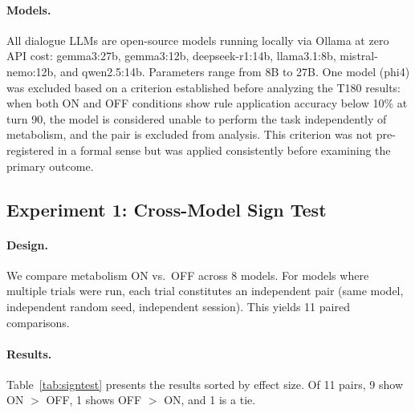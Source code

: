 \documentclass[11pt,a4paper]{article}
\begin{document}
\paragraph{Models.}
All dialogue LLMs are open-source models running locally via Ollama at zero API cost: gemma3:27b, gemma3:12b, deepseek-r1:14b, llama3.1:8b, mistral-nemo:12b, and qwen2.5:14b.
Parameters range from 8B to 27B.
One model (phi4) was excluded based on a criterion established before analyzing the T180 results: when both ON and OFF conditions show rule application accuracy below 10\% at turn 90, the model is considered unable to perform the task independently of metabolism, and the pair is excluded from analysis.
This criterion was not pre-registered in a formal sense but was applied consistently before examining the primary outcome.

\subsection{Experiment 1: Cross-Model Sign Test}
\label{sec:exp-signtest}

\paragraph{Design.}
We compare metabolism ON vs.\ OFF across 8 models.
For models where multiple trials were run, each trial constitutes an independent pair (same model, independent random seed, independent session).
This yields 11 paired comparisons.

\paragraph{Results.}
Table~\ref{tab:signtest} presents the results sorted by effect size.
Of 11 pairs, 9 show ON $>$ OFF, 1 shows OFF $>$ ON, and 1 is a tie.
\end{document}
